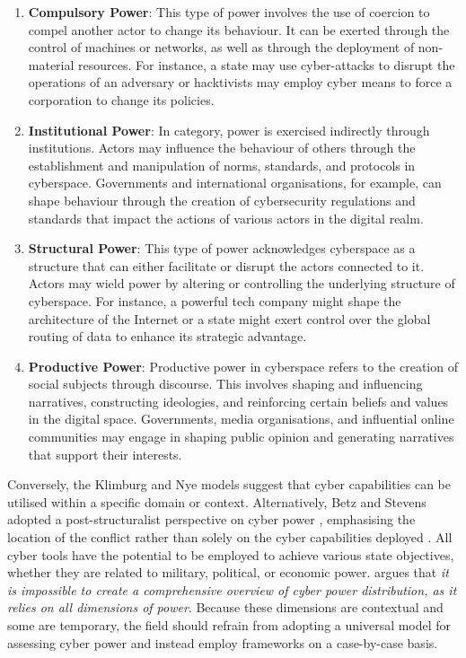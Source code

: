 \begin{enumerate}
    \item \textbf{Compulsory Power}: This type of power involves the use of coercion to compel another actor to change its behaviour. It can be exerted through the control of machines or networks, as well as through the deployment of non-material resources. For instance, a state may use cyber-attacks to disrupt the operations of an adversary or hacktivists may employ cyber means to force a corporation to change its policies.
    \item \textbf{Institutional Power}: In category, power is exercised indirectly through institutions. Actors may influence the behaviour of others through the establishment and manipulation of norms, standards, and protocols in cyberspace. Governments and international organisations, for example, can shape behaviour through the creation of cybersecurity regulations and standards that impact the actions of various actors in the digital realm.
    \item \textbf{Structural Power}: This type of power acknowledges cyberspace as a structure that can either facilitate or disrupt the actors connected to it. Actors may wield power by altering or controlling the underlying structure of cyberspace. For instance, a powerful tech company might shape the architecture of the Internet or a state might exert control over the global routing of data to enhance its strategic advantage.
    \item \textbf{Productive Power}: Productive power in cyberspace refers to the creation of social subjects through discourse. This involves shaping and influencing narratives, constructing ideologies, and reinforcing certain beliefs and values in the digital space. Governments, media organisations, and influential online communities may engage in shaping public opinion and generating narratives that support their interests.
\end{enumerate}

Conversely, the Klimburg and Nye models suggest that cyber capabilities can be utilised within a specific domain or context. Alternatively, Betz and Stevens adopted a post-structuralist perspective on cyber power \autocite{dunncavelty_2018_europes}, emphasising the location of the conflict rather than solely on the cyber capabilities deployed \autocite{vanhaaster_2016_assessing}. All cyber tools have the potential to be employed to achieve various state objectives, whether they are related to military, political, or economic power. \textcite[21]{vanhaaster_2016_assessing} argues that \textit{it is impossible to create a comprehensive overview of cyber power distribution, as it relies on all dimensions of power}. Because these dimensions are contextual and some are temporary, the field should refrain from adopting a universal model for assessing cyber power and instead employ frameworks on a case-by-case basis. 

